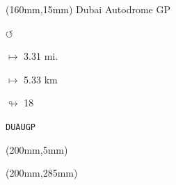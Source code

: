 \begin{textblock*}{40mm}(160mm,15mm)%
Dubai Autodrome GP
\par \Huge$\circlearrowleft$
\Large
\par$\mapsto$ 3.31 mi.
\par$\mapsto$ 5.33 km
\par$\looparrowright$ 18
\par\hfill\tiny\tt DUAUGP\\
\end{textblock*}
\begin{textblock*}{20mm}(200mm,5mm)%
\fbox{\thepage}
\end{textblock*}
\begin{textblock*}{20mm}(200mm,285mm)%
\fbox{\thepage}
\end{textblock*}
\null\newpage

